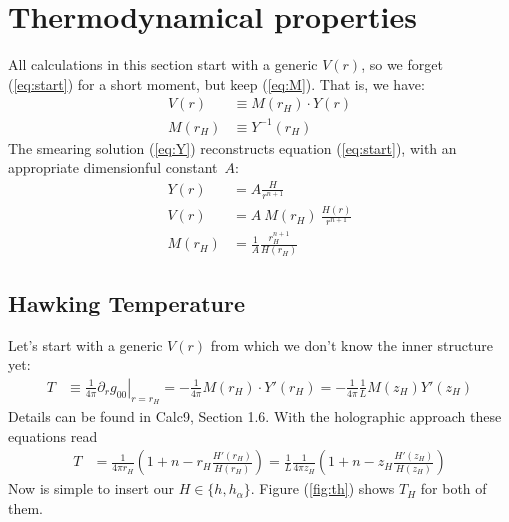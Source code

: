 \documentclass[10pt,a4paper, fleqn]{article}
\begin{document}
\section{Thermodynamical properties}
All calculations in this section start with a generic $V(r)$, so we forget (\ref{eq:start}) for a short moment, but keep (\ref{eq:M}). That is, we have:
%
\begin{subequations}
\begin{align}
V(r) &\equiv M(r_H) \cdot Y(r) \label{eq:simpleV} \\
M(r_H) &\equiv Y^{-1}(r_H)%
\label{eq:simpleM}
\end{align}
\end{subequations}
%
The smearing solution (\ref{eq:Y}) reconstructs equation (\ref{eq:start}), with an appropriate dimensionful constant~$A$:
%
\begin{subequations}
\begin{align}
Y(r) &= A \frac{H}{r^{n+1}} \label{eq:Y} \\
V(r) &= A~M(r_H)~\frac{H(r)}{r^{n+1}} \\
M(r_H) &= \frac{1}{A} \frac{r_H^{n+1}}{H(r_H)}
\end{align}
\end{subequations}
%
\subsection{Hawking Temperature}
Let's start with a generic $V(r)$ from which we don't know the inner structure yet:
%
\begin{align}
T &\equiv \frac{1}{4\pi} \left. \partial_r g_{00} \right|_{r=r_H}
= - \frac{1}{4\pi} M(r_H) \cdot Y'(r_H)
= - \frac{1}{4\pi}\frac 1L M(z_H) Y'(z_H) 
\end{align}
%
Details can be found in Calc9, Section 1.6. With the holographic approach these equations read
%
\begin{align}
T &= \frac{1}{4\pi r_H} \left( 1 + n - r_H \frac{H'(r_H)}{H(r_H)} \right)
 = \frac 1L \frac{1}{4\pi z_H} \left( 1 + n - z_H \frac{H'(z_H)}{H(z_H)} \right)
 \label{eq:simpleT}
\end{align}
%
Now is simple to insert our $H\in\{h,h_\alpha\}$. Figure (\ref{fig:th}) shows $T_H$ for both of them.
\end{document}
